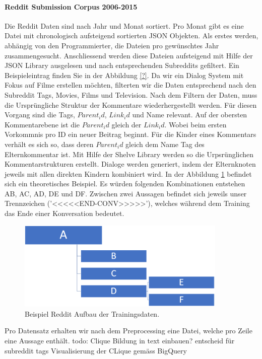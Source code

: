 \paragraph{Reddit Submission Corpus 2006-2015} Die Reddit Daten sind nach Jahr und Monat sortiert. Pro Monat gibt es eine Datei mit chronologisch aufsteigend sortierten JSON Objekten.
Als erstes werden, abhängig von den Programmierter, die Dateien pro gewünschtes Jahr zusammengesucht. Anschliessend werden diese Dateien aufsteigend mit Hilfe der JSON Library ausgelesen und nach entsprechenden Subreddits gefiltert. Ein Beispieleintrag finden Sie in der Abbildung \ref{?}. Da wir ein Dialog System mit Fokus auf Filme erstellen möchten, filterten wir die Daten entsprechend nach den Subreddit Tags, Movies, Films und Television. Nach dem Filtern der Daten, muss die Ursprüngliche Struktur der Kommentare wiederhergestellt werden. Für diesen Vorgang sind die Tags, $Parent_id$, $Link_id$ und Name relevant. Auf der obersten Kommentarebene ist die $Parent_id$ gleich der $Link_id$. Wobei beim ersten Vorkommnis pro ID ein neuer Beitrag beginnt. Für die Kinder eines Kommentars verhält es sich so, dass deren $Parent_id$ gleich dem Name Tag des Elternkommentar ist. Mit Hilfe der Shelve Library werden so die Urpsrünglichen Kommentarstrukturen erstellt. Dialoge werden generiert, indem der Elternknoten jeweils mit allen direkten Kindern kombiniert wird. In der Abbildung \ref{fig:data:reddit:utterance:construction} befindet sich ein theoretisches Beispiel. Es würden folgenden Kombinationen entstehen AB, AC, AD, DE und DF. Zwischen zwei Aussagen befindet sich jeweils unser Trennzeichen ('<<<<<END-CONV>>>>>'), welches während dem Training das Ende einer Konversation bedeutet.
\begin{figure}[h]
	\centering
	\includegraphics[width=10cm]{img/reddit_utterance_construction.PNG}
	\caption{Beispiel Reddit Aufbau der Trainingsdaten.}
	\label{fig:data:reddit:utterance:construction}
\end{figure}
Pro Datensatz erhalten wir nach dem Preprocessing eine Datei, welche pro Zeile eine Aussage enthält.
todo: Clique Bildung in text einbauen? entscheid für subreddit tags Visualisierung der CLique gemäss BigQuery
